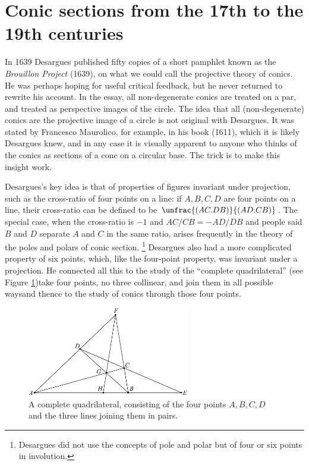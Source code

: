 \section{Conic sections from the 17th to the 19th centuries}
In 1639 Desargues published fifty copies of a short pamphlet known as
the \emph{Brouillon Project} (1639), on what we could call the
projective theory of conics. He was perhaps hoping for useful critical
feedback, but he never returned to rewrite his account.  In the essay,
all non-degenerate conics are treated on a par, and treated as
perspective images of the circle. The idea that all (non-degenerate)
conics are the projective image of a circle is not original with
Desargues. It was stated by Francesco Maurolico, for example, in his
book  (1611), which it is likely Desargues knew, and in any case it is
visually apparent to anyone who thinks of the conics as sections of a
cone on a circular base. The trick is to make this insight work.

Desargues's key idea is that of properties of figures invariant under
projection, such as the cross-ratio of four points on a line: if $A,
B, C, D$ are four points on a line, their cross-ratio can be defined to be
$\unfrac{(AC.DB)}{(AD.CB)}$. The special case,  when the cross-ratio
is $-1$ and $AC/CB=-AD/DB$ and people said $B$ and $D$ separate $A$
and $C$ in the same ratio, arises frequently in the theory of the
poles and polars of conic section.%
%
\footnote{Desargues did not use the
  concepts of pole and polar but of four or six points in involution.}
%
Desargues also had a more complicated property of six points, which,
like the four-point property, was invariant under a projection. He
connected all this to the study of the ``complete quadrilateral'' (see
Figure \ref{figCompleteQuad})\emdash take four points, no three
collinear, and join them in all possible ways\emdash  and thence to
the study of conics through those four points.

\begin{figure}
\includegraphics[width=200pt]{main/CompleteQuad3}
\caption{A complete quadrilateral, consisting of the four points $A, B,
C, D$ and the three lines joining them in pairs.}
\label{figCompleteQuad}
\end{figure}


